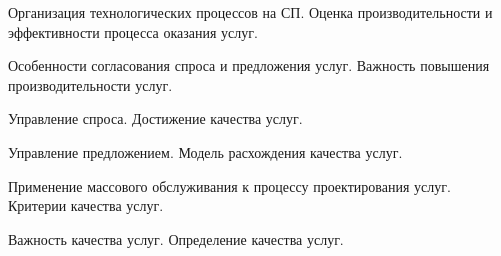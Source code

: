 \documentclass[
	14pt,
	a4paper,
	]
	{scrartcl}
\begin{document}
\newpage


\shapk
{}
\setcounter{zad}{0}

\vfill
\z Организация технологических процессов на СП.
 \vfill
\z Оценка производительности и эффективности процесса оказания услуг.
 \vfill

\vfill

\newpage


\shapk
{}
\setcounter{zad}{0}

\vfill
\z Особенности согласования спроса и предложения услуг.
 \vfill
\z Важность повышения производительности услуг.
 \vfill

\vfill

\newpage


\shapk
{}
\setcounter{zad}{0}

\vfill
\z Управление спроса.
 \vfill
\z Достижение качества услуг.
 \vfill

\vfill

\newpage


\shapk
{}
\setcounter{zad}{0}

\vfill
\z Управление предложением.
 \vfill
\z Модель расхождения качества услуг.
 \vfill

\vfill

\newpage


\shapk
{}
\setcounter{zad}{0}

\vfill
\z Применение массового обслуживания к процессу проектирования услуг.
 \vfill
\z Критерии качества услуг.
 \vfill

\vfill

\newpage


\shapk
{}
\setcounter{zad}{0}

\vfill
\z Важность качества услуг.
 \vfill
\z Определение качества услуг.
 \vfill

\vfill

\newpage
\end{document}
